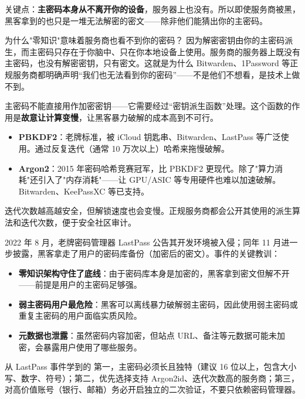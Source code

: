 关键点：\textbf{主密码本身从不离开你的设备}，服务器上也没有。所以即使服务商被黑，黑客拿到的也只是一堆无法解密的密文——除非他们能猜出你的主密码。

\begin{tcbinfo}{为什么"零知识"意味着服务商也看不到你的密码？}
因为解密密钥由你的主密码派生，而主密码只存在于你脑中、只在你本地设备上使用。服务商的服务器上既没有主密码，也没有解密密钥，只有密文。这就是为什么 Bitwarden、1Password 等正规服务商都明确声明“我们也无法看到你的密码”——不是他们不想看，是技术上做不到。

\end{tcbinfo}


主密码不能直接用作加密密钥——它需要经过“密钥派生函数”处理。这个函数的作用是\textbf{故意让计算变慢}，让黑客暴力破解的成本高到不可行。

\begin{itemize}
  \item \textbf{PBKDF2}：老牌标准，被 iCloud 钥匙串、Bitwarden、LastPass 等广泛使用。通过反复迭代（通常 10 万次以上）哈希来拖慢破解。
  \item \textbf{Argon2}：2015 年密码哈希竞赛冠军，比 PBKDF2 更现代。除了"算力消耗"还引入了"内存消耗"——让 GPU/ASIC 等专用硬件也难以加速破解。Bitwarden、KeePassXC 等已支持。
\end{itemize}

迭代次数越高越安全，但解锁速度也会变慢。正规服务商都会公开其使用的派生算法和迭代次数，便于安全社区审计。


2022 年 8 月，老牌密码管理器 LastPass 公告其开发环境被入侵；同年 11 月进一步披露，黑客拿走了用户的密码库备份（加密后的密文）。事件的关键教训：

\begin{itemize}
  \item \textbf{零知识架构守住了底线}：由于密码库本身是加密的，黑客拿到密文但解不开——前提是用户的主密码足够强。
  \item \textbf{弱主密码用户最危险}：黑客可以离线暴力破解弱主密码，因此使用弱主密码或重复主密码的用户面临实质风险。
  \item \textbf{元数据也泄露}：虽然密码内容加密，但站点 URL、备注等元数据可能未加密，会暴露用户使用了哪些服务。
\end{itemize}

\begin{tcbwarn}{从 LastPass 事件学到的}
第一，主密码必须长且独特（建议 16 位以上，包含大小写、数字、符号）；第二，优先选择支持 Argon2id、迭代次数高的服务商；第三，对高价值账号（银行、邮箱）务必开启独立的二次验证，不要只依赖密码管理器。

\end{tcbwarn}

